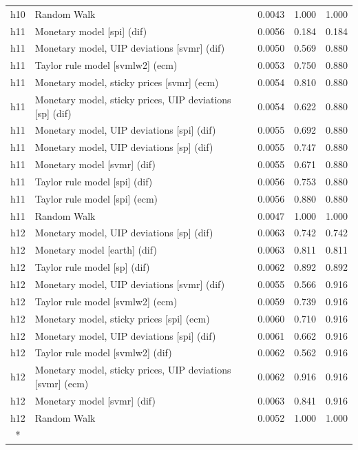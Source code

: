 \begin{ThreePartTable}
\begin{longtable}[t]{cp{5.5cm}ccc}
h10 & \raggedright Random Walk & 0.0043 & 1.000 & 1.000\\
\addlinespace
h11 & \raggedright Monetary model [spi] (dif) & 0.0056 & 0.184 & 0.184\\
h11 & \raggedright Monetary model, UIP deviations [svmr] (dif) & 0.0050 & 0.569 & 0.880\\
h11 & \raggedright Taylor rule model [svmlw2] (ecm) & 0.0053 & 0.750 & 0.880\\
h11 & \raggedright Monetary model, sticky prices [svmr] (ecm) & 0.0054 & 0.810 & 0.880\\
h11 & \raggedright Monetary model, sticky prices, UIP deviations [sp] (dif) & 0.0054 & 0.622 & 0.880\\
h11 & \raggedright Monetary model, UIP deviations [spi] (dif) & 0.0055 & 0.692 & 0.880\\
h11 & \raggedright Monetary model, UIP deviations [sp] (dif) & 0.0055 & 0.747 & 0.880\\
h11 & \raggedright Monetary model [svmr] (dif) & 0.0055 & 0.671 & 0.880\\
h11 & \raggedright Taylor rule model [spi] (dif) & 0.0056 & 0.753 & 0.880\\
h11 & \raggedright Taylor rule model [spi] (ecm) & 0.0056 & 0.880 & 0.880\\
h11 & \raggedright Random Walk & 0.0047 & 1.000 & 1.000\\
\addlinespace
h12 & \raggedright Monetary model, UIP deviations [sp] (dif) & 0.0063 & 0.742 & 0.742\\
h12 & \raggedright Monetary model [earth] (dif) & 0.0063 & 0.811 & 0.811\\
h12 & \raggedright Taylor rule model [sp] (dif) & 0.0062 & 0.892 & 0.892\\
h12 & \raggedright Monetary model, UIP deviations [svmr] (dif) & 0.0055 & 0.566 & 0.916\\
h12 & \raggedright Taylor rule model [svmlw2] (ecm) & 0.0059 & 0.739 & 0.916\\
h12 & \raggedright Monetary model, sticky prices [spi] (ecm) & 0.0060 & 0.710 & 0.916\\
h12 & \raggedright Monetary model, UIP deviations [spi] (dif) & 0.0061 & 0.662 & 0.916\\
h12 & \raggedright Taylor rule model [svmlw2] (dif) & 0.0062 & 0.562 & 0.916\\
h12 & \raggedright Monetary model, sticky prices, UIP deviations [svmr] (ecm) & 0.0062 & 0.916 & 0.916\\
h12 & \raggedright Monetary model [svmr] (dif) & 0.0063 & 0.841 & 0.916\\
h12 & \raggedright Random Walk & 0.0052 & 1.000 & 1.000\\*
\end{longtable}
\end{ThreePartTable}
\endgroup{}
